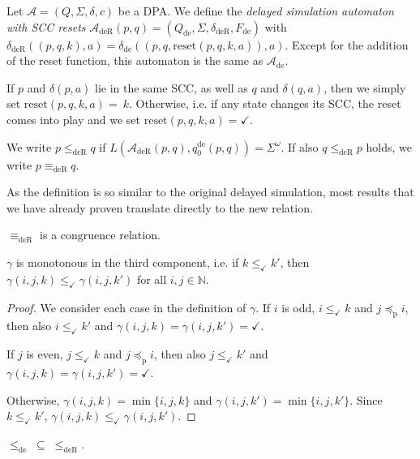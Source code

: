 \begin{defn}
	Let $\mathcal{A} = (Q, \Sigma, \delta, c)$ be a DPA. We define the \emph{delayed simulation automaton with SCC resets} $\mathcal{A}_\text{deR}(p, q) = (Q_\text{de}, \Sigma, \delta_\text{deR}, F_\text{de})$ with $\delta_\text{deR}((p, q, k), a) = \delta_\text{de}((p, q, \text{reset}(p, q, k, a)), a)$. Except for the addition of the reset function, this automaton is the same as $\mathcal{A}_\text{de}$.
	
	If $p$ and $\delta(p, a)$ lie in the same SCC, as well as $q$ and $\delta(q, a)$, then we simply set $\text{reset}(p, q, k, a) =~k$. Otherwise, i.e. if any state changes its SCC, the reset comes into play and we set $\text{reset}(p, q, k, a) = \checkmark$.
	
	We write $p \leq_\text{deR} q$ if $L(\mathcal{A}_\text{deR}(p, q), q_0^\text{de}(p, q)) = \Sigma^\omega$. If also $q \leq_\text{deR} p$ holds, we write $p \equiv_\text{deR} q$.
\end{defn}

As the definition is so similar to the original delayed simulation, most results that we have already proven translate directly to the new relation. 

\begin{theorem}
	$\equiv_\text{deR}$ is a congruence relation.
\end{theorem}

\begin{lem}
\label{lem:fritzwilke:gamma_mono}
	$\gamma$ is monotonous in the third component, i.e. if $k \leq_\checkmark k'$, then $\gamma(i, j, k) \leq_\checkmark \gamma(i, j, k')$ for all $i, j \in \mathbb{N}$.
\end{lem}

\begin{proof}
	We consider each case in the definition of $\gamma$. If $i$ is odd, $i \leq_\checkmark k$ and $j \preceq_\text{p} i$, then also $i \leq_\checkmark k'$ and $\gamma(i, j, k) = \gamma(i, j, k') = \checkmark$.
	
	If $j$ is even, $j \leq_\checkmark k$ and $j \preceq_\text{p} i$, then also $j \leq_\checkmark k'$ and $\gamma(i, j, k) = \gamma(i, j, k') = \checkmark$.
	
	Otherwise, $\gamma(i, j, k) = \min \{i, j, k\}$ and $\gamma(i, j, k') = \min \{i, j, k'\}$. Since $k \leq_\checkmark k'$, $\gamma(i, j, k) \leq_\checkmark \gamma(i, j, k')$.
\end{proof}

\begin{lem}
	$\leq_\text{de} \;\subseteq\; \leq_\text{deR}$.
\end{lem}

